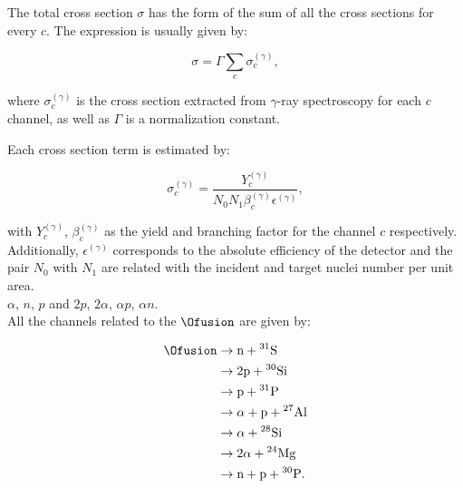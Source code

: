 \documentclass[openany]{book}
\begin{document}
The total cross section $\sigma$ has the form of the sum of all the cross sections for every $c$. The expression is usually given by:

\begin{equation}\label{eq:middleFusion_experimental_crossSection_channelSum}
	\sigma = \Gamma \sum_{c} {\sigma^{(\gamma)}_{c}}, 
\end{equation}

where $\sigma^{(\gamma)}_{c}$ is the cross section extracted from $\gamma$-ray spectroscopy for each $c$ channel, as well as $\Gamma$ is a normalization constant. 

Each cross section term is estimated by:

\begin{equation}\label{eq:middleFusion_experimental_crossSection_channelSum_c}
	\sigma^{(\gamma)}_{c} = \frac{Y^{(\gamma)}_{c} }{N_0N_1\beta^{(\gamma)}_{c}  \epsilon^{(\gamma)}},
\end{equation}

with $Y^{(\gamma)}_{c}$, $\beta^{(\gamma)}_{c}$  as the yield and branching factor for the channel $c$ respectively. Additionally, $\epsilon^{(\gamma)}$ corresponds to the  absolute efficiency of the detector and the pair $N_0$ with $N_1$ are related with the incident and target nuclei number per unit area. \\

\cite{kuronen_keinonen_tikkanen_1987} $\alpha$, $n$, $p$ and $2p$, $2\alpha$, $\alpha p$, $\alpha n$. \\

All the channels related to the $\Ofusion$ are given by: 

\begin{equation}\label{eq:middleFusion_experimental_16O16O_channels}
	\begin{split}
		\Ofusion &\rightarrow \mathrm{n + {}^{31}S} \\
						&\rightarrow \mathrm{2p + {}^{30}Si} \\
						&\rightarrow \mathrm{p + {}^{31}P} \\
						&\rightarrow \mathrm{\alpha + p + {}^{27}Al} \\
						&\rightarrow \mathrm{\alpha + {}^{28}Si} \\
						&\rightarrow \mathrm{2\alpha + {}^{24}Mg} \\
						&\rightarrow \mathrm{n + p + {}^{30}P}. \\
	\end{split}
\end{equation}
\end{document}

